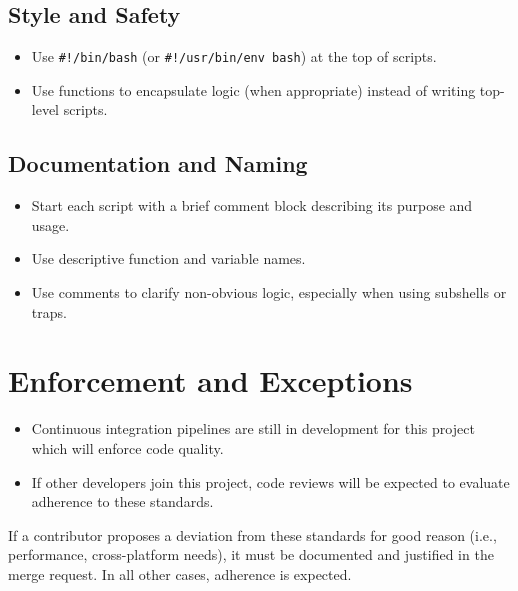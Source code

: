 \subsection{Style and Safety}
\begin{itemize}\itemsep0em
    \item Use \texttt{\#!/bin/bash} (or \texttt{\#!/usr/bin/env bash}) at the top of scripts.
    \item Use functions to encapsulate logic (when appropriate) instead of writing top-level scripts.
\end{itemize}

\subsection{Documentation and Naming}
\begin{itemize}\itemsep0em
    \item Start each script with a brief comment block describing its purpose and usage.
    \item Use descriptive function and variable names.
    \item Use comments to clarify non-obvious logic, especially when using subshells or traps.
\end{itemize}











\section{Enforcement and Exceptions}

\begin{itemize}\itemsep0em
    \item Continuous integration pipelines are still in development for this project which will enforce code quality.
    \item If other developers join this project, code reviews will be expected to evaluate adherence to these standards.
\end{itemize}

If a contributor proposes a deviation from these standards for good reason (i.e., performance, cross-platform needs), it must be documented and justified in the merge request. In all other cases, adherence is expected.





